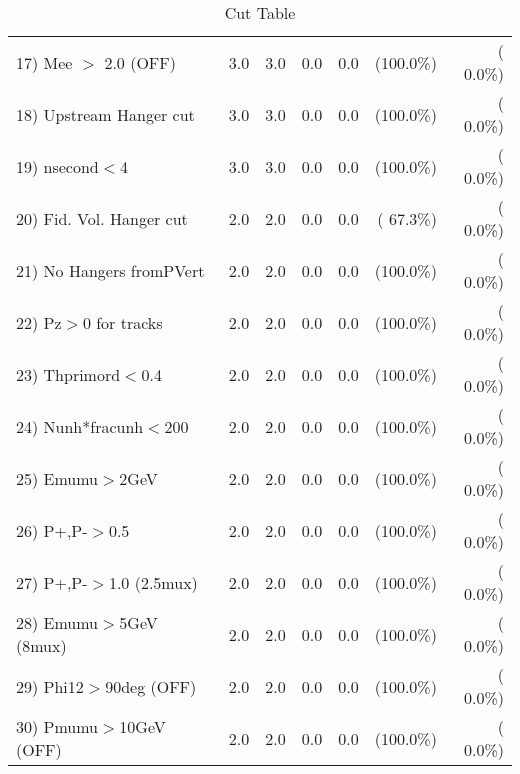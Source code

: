 \begin{table}[h!]
\begin{tabular}{||l||r|r|r|r|r|r||}
 17) Mee $>$ 2.0  (OFF)   &          3.0 &          3.0 &          0.0 &          0.0 & (100.0\%) & (  0.0\%) \\
 18) Upstream Hanger cut  &          3.0 &          3.0 &          0.0 &          0.0 & (100.0\%) & (  0.0\%) \\
 19) nsecond$<$4          &          3.0 &          3.0 &          0.0 &          0.0 & (100.0\%) & (  0.0\%) \\
 20) Fid. Vol. Hanger cut &          2.0 &          2.0 &          0.0 &          0.0 & ( 67.3\%) & (  0.0\%) \\
 21) No Hangers fromPVert &          2.0 &          2.0 &          0.0 &          0.0 & (100.0\%) & (  0.0\%) \\
 22) Pz$>$0 for tracks    &          2.0 &          2.0 &          0.0 &          0.0 & (100.0\%) & (  0.0\%) \\
 23) Thprimord$<$0.4      &          2.0 &          2.0 &          0.0 &          0.0 & (100.0\%) & (  0.0\%) \\
 24) Nunh*fracunh$<$200   &          2.0 &          2.0 &          0.0 &          0.0 & (100.0\%) & (  0.0\%) \\
 25) Emumu$>$2GeV         &          2.0 &          2.0 &          0.0 &          0.0 & (100.0\%) & (  0.0\%) \\
 26) P+,P-$>$0.5          &          2.0 &          2.0 &          0.0 &          0.0 & (100.0\%) & (  0.0\%) \\
 27) P+,P-$>$1.0 (2.5mux) &          2.0 &          2.0 &          0.0 &          0.0 & (100.0\%) & (  0.0\%) \\
 28) Emumu$>$5GeV  (8mux) &          2.0 &          2.0 &          0.0 &          0.0 & (100.0\%) & (  0.0\%) \\
 29) Phi12$>$90deg  (OFF) &          2.0 &          2.0 &          0.0 &          0.0 & (100.0\%) & (  0.0\%) \\
 30) Pmumu$>$10GeV  (OFF) &          2.0 &          2.0 &          0.0 &          0.0 & (100.0\%) & (  0.0\%) \\
 \hline
 \hline
 \end{tabular}
 \caption{Cut Table           }
 \label{tab-cutcohjpsi-mumu_anuecc}
 \end{table}
